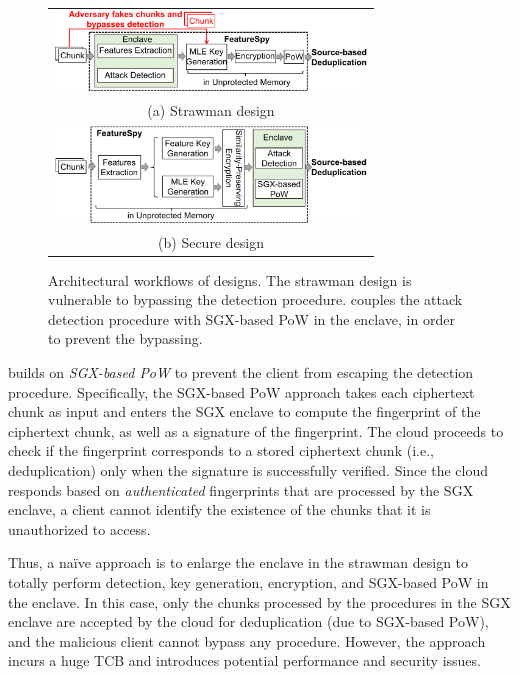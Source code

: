 

\begin{figure}
  \centering
  \begin{tabular}{c}
    \includegraphics[width=3.25in]{pic/featurespy/naive.pdf} \\
    {\small (a) Strawman design} \vspace{5pt}\\
    \includegraphics[width=3.25in]{pic/featurespy/architecture.pdf} \\
    {\small (b) Secure design}
  \end{tabular}
  \vspace{-6pt}
  \caption{Architectural workflows of designs. The strawman design is vulnerable to bypassing the detection procedure. \sysnameF couples the attack detection procedure with SGX-based PoW \cite{ren21} in the enclave,  in order to prevent the bypassing.}
  \label{fig:architecture}
  \vspace{-6pt}
\end{figure}


\sysnameF builds on {\em SGX-based PoW} \cite{ren21} to prevent the client from escaping the detection procedure. Specifically, the SGX-based PoW approach \cite{ren21} takes each ciphertext chunk as input and enters the SGX enclave to compute the fingerprint of the ciphertext chunk, as well as a signature of the fingerprint. The cloud proceeds to check if the fingerprint corresponds to a stored ciphertext chunk (i.e., deduplication) only when the signature is successfully verified. Since the cloud responds based on {\em authenticated} fingerprints that are processed by the SGX enclave, a client cannot identify the existence of the chunks that it is unauthorized to access.

Thus, a na\"{i}ve approach is to enlarge the enclave in the strawman design to totally perform detection, key generation, encryption, and SGX-based PoW in the enclave. In this case, only the chunks processed by the procedures in the SGX enclave are accepted by the cloud for deduplication (due to SGX-based PoW), and the malicious client cannot bypass any procedure.
However, the approach incurs a huge TCB and introduces potential performance \cite{arnautov16, harnik18, dinhngoc19} and security \cite{lie05} issues.


